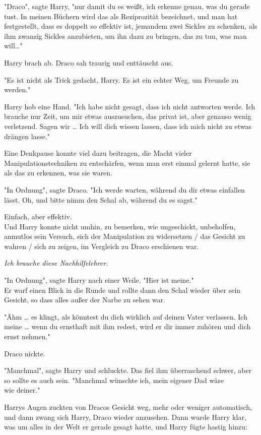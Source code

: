 {"Draco", sagte Harry, "nur damit du es weißt, ich erkenne genau, was du gerade tust. In meinen Büchern wird das als Reziprozität bezeichnet, und man hat festgestellt, dass es doppelt so effektiv ist, jemandem zwei Sickles zu schenken, als ihm zwanzig Sickles anzubieten, um ihn dazu zu bringen, das zu tun, was man will…"

Harry brach ab. Draco sah traurig und enttäuscht aus.

"Es ist nicht als Trick gedacht, Harry. Es ist ein echter Weg, um Freunde zu werden."

Harry hob eine Hand. "Ich habe nicht gesagt, dass ich nicht antworten werde. Ich brauche nur Zeit, um mir etwas auszusuchen, das privat ist, aber genauso wenig verletzend. Sagen wir … Ich will dich wissen lassen, dass ich mich nicht zu etwas drängen lasse."

Eine Denkpause konnte viel dazu beitragen, die Macht vieler Manipulationstechniken zu entschärfen, wenn man erst einmal gelernt hatte, sie als das zu erkennen, was sie waren.

"In Ordnung", sagte Draco. "Ich werde warten, während du dir etwas einfallen lässt. Oh, und bitte nimm den Schal ab, während du es sagst."

Einfach, aber effektiv.\\ Und Harry konnte nicht umhin, zu bemerken, wie ungeschickt, unbeholfen, anmutlos sein Versuch, sich der Manipulation zu widersetzen / das Gesicht zu wahren / sich zu zeigen, im Vergleich zu Draco erschienen war.

\emph{Ich brauche diese Nachhilfelehrer.}

"In Ordnung", sagte Harry nach einer Weile. "Hier ist meine."\\ Er warf einen Blick in die Runde und rollte dann den Schal wieder über sein Gesicht, so dass alles außer der Narbe zu sehen war.

"Ähm … es klingt, als könntest du dich wirklich auf deinen Vater verlassen. Ich meine … wenn du ernsthaft mit ihm redest, wird er dir immer zuhören und dich ernst nehmen."

Draco nickte.

"Manchmal", sagte Harry und schluckte. Das fiel ihm überraschend schwer, aber so sollte es auch sein. "Manchmal wünschte ich, mein eigener Dad wäre\\ wie deiner."

Harrys Augen zuckten von Dracos Gesicht weg, mehr oder weniger automatisch, und dann zwang sich Harry, Draco wieder anzusehen. Dann wurde Harry klar, was um alles in der Welt er gerade gesagt hatte, und Harry fügte hastig hinzu:

}
